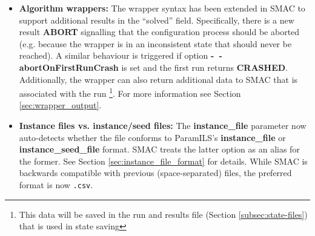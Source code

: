 \begin{itemize}
\item \textbf{Algorithm wrappers:} 
The wrapper syntax has been extended in SMAC to support additional results in the ``solved'' field. Specifically, there is a new result \textbf{ABORT} signalling that the configuration process should be aborted (e.g. because the wrapper is in an inconsistent state that should never be reached). A similar behaviour is triggered if option \textbf{-~$\!$-abortOnFirstRunCrash} is set and the first run returns \textbf{CRASHED}. Additionally, the wrapper can also return additional data to SMAC that is associated with the run \footnote{This data will be saved in the run and results file (Section \ref{subsec:state-files}) that is used in state saving}. For more information see Section \ref{sec:wrapper_output}.

\item \textbf{Instance files vs. instance/seed files:} 
The \textbf{instance\_file} parameter now auto-detects whether the file conforms to ParamILS's \textbf{instance\_file} or \textbf{instance\_seed\_file} format. SMAC treats the latter option as an alias for the former. See Section \ref{sec:instance_file_format} for details.
While SMAC is backwards compatible with previous (space-separated) files, the preferred format is now \texttt{.csv}.
\end{itemize}

